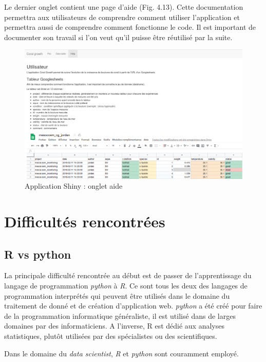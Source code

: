 \documentclass[]{report}
\begin{document}
Le dernier onglet contient une page d'aide (Fig. 4.13). Cette
documentation permettra aux utilisateurs de comprendre comment utiliser
l'application et permettra aussi de comprendre comment fonctionne le
code. Il est important de documenter son travail si l'on veut qu'il
puisse être réutilisé par la suite.

\begin{figure}[h!]
\includegraphics[]{../image/aide.PNG}
\caption{Application Shiny : onglet aide}
\end{figure}

\null
\newpage

\section{Difficultés rencontrées}\label{difficultes-rencontrees}

\subsection{R vs python}\label{r-vs-python}

La principale difficulté rencontrée au début est de passer de
l'apprentissage du langage de programmation \emph{python} à \emph{R}. Ce
sont tous les deux des langages de programmation interprétés qui peuvent
être utilisés dans le domaine du traitement de donné et de création
d'application web. \emph{python} a été créé pour faire de la
programmation informatique généraliste, il est utilisé dans de larges
domaines par des informaticiens. A l'inverse, R est dédié aux analyses
statistiques, plutôt utilisées par des spécialistes ou des
scientifiques.

Dans le domaine du \emph{data scientist}, \emph{R} et \emph{python} sont
couramment employé.
\end{document}
